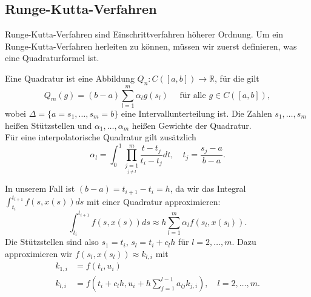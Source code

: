 \subsection{Runge-Kutta-Verfahren}
Runge-Kutta-Verfahren sind Einschrittverfahren höherer Ordnung. Um ein Runge-Kutta-Verfahren herleiten zu können, müssen
wir zuerst definieren, was eine Quadraturformel ist.
\begin{definition}
    Eine Quadratur ist eine Abbildung $Q_n: C([a,b])\rightarrow \mathbb{R}$, für die gilt
    \[
        Q_m(g) = (b-a)\sum_{l=1}^{m}\alpha_l g(s_l) \quad \text{ für alle } g\in C([a,b]),
    \]
    wobei $\Delta = \{a=s_1, \dots, s_m=b\}$ eine Intervallunterteilung ist. Die Zahlen $s_1, \dots, s_m$ heißen Stützstellen und
    $\alpha_1, \dots, \alpha_m$ heißen Gewichte der Quadratur.\\
    Für eine interpolatorische Quadratur gilt zusätzlich
    \[
        \alpha_l = \int_{0}^{1} \prod_{\underset{j\neq l}{j=1}}^{m} \frac{t-t_j}{t_i-t_j} dt,
        \quad t_j = \frac{s_j-a}{b-a}.
    \]
\end{definition}
In unserem Fall ist $(b-a)=t_{i+1}-t_i=h$, da wir das Integral $\int_{t_i}^{t_{i+1}} f(s,x(s))ds$ mit einer Quadratur
approximieren:
\[
    \int_{t_i}^{t_{i+1}} f(s,x(s))ds \approx h \sum_{l=1}^{m}\alpha_l f(s_l,x(s_l)).
\]
Die Stützstellen sind also $s_1=t_i$, $s_l=t_i+c_{l} h$ für $l = 2,\dots, m$. Dazu approximieren wir
$f(s_l,x(s_l))\approx k_{l,i}$ mit
\begin{align}
    k_{1,i} &= f(t_i,u_i) \nonumber \\
    k_{l,i} &= f(t_i+c_lh, u_i + h\sum_{j=1}^{l-1}a_{lj}k_{j,i} ), \quad l=2,\dots,m.   \label{eq:rk}
\end{align}

